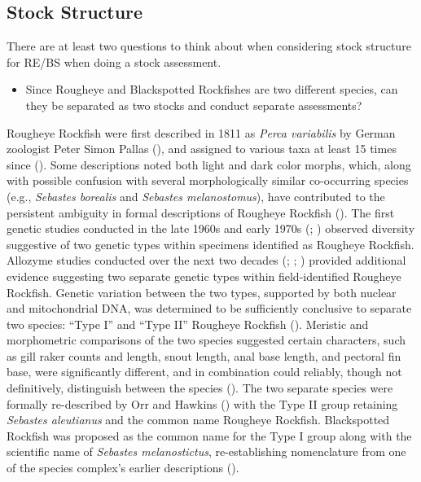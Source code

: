\documentclass[
]{article}
\providecommand{\tightlist}{%
  \setlength{\itemsep}{0pt}\setlength{\parskip}{0pt}}\usepackage{longtable,booktabs,array}
\begin{document}
\subsection{Stock Structure}\label{sec-stock_structure}

There are at least two questions to think about when considering stock
structure for RE/BS when doing a stock assessment.

\begin{itemize}
\tightlist
\item
  Since Rougheye and Blackspotted Rockfishes are two different species,
  can they be separated as two stocks and conduct separate assessments?
\end{itemize}

Rougheye Rockfish were first described in 1811 as \emph{Perca
variabilis} by German zoologist Peter Simon Pallas
(), and
assigned to various taxa at least 15 times since
(). Some
descriptions noted both light and dark color morphs, which, along with
possible confusion with several morphologically similar co-occurring
species (e.g., \emph{Sebastes borealis} and \emph{Sebastes
melanostomus}), have contributed to the persistent ambiguity in formal
descriptions of Rougheye Rockfish (). The first genetic studies conducted in the late
1960s and early 1970s (; ) observed diversity suggestive of two genetic types within
specimens identified as Rougheye Rockfish. Allozyme studies conducted
over the next two decades (; ;
) provided
additional evidence suggesting two separate genetic types within
field-identified Rougheye Rockfish. Genetic variation between the two
types, supported by both nuclear and mitochondrial DNA, was determined
to be sufficiently conclusive to separate two species: ``Type I'' and
``Type II'' Rougheye Rockfish (). Meristic and morphometric comparisons of the two species
suggested certain characters, such as gill raker counts and length,
snout length, anal base length, and pectoral fin base, were
significantly different, and in combination could reliably, though not
definitively, distinguish between the species
(). The
two separate species were formally re-described by Orr and Hawkins
() with the Type II group retaining
\emph{Sebastes aleutianus} and the common name Rougheye Rockfish.
Blackspotted Rockfish was proposed as the common name for the Type I
group along with the scientific name of \emph{Sebastes melanostictus},
re-establishing nomenclature from one of the species complex's earlier
descriptions ().
\end{document}
